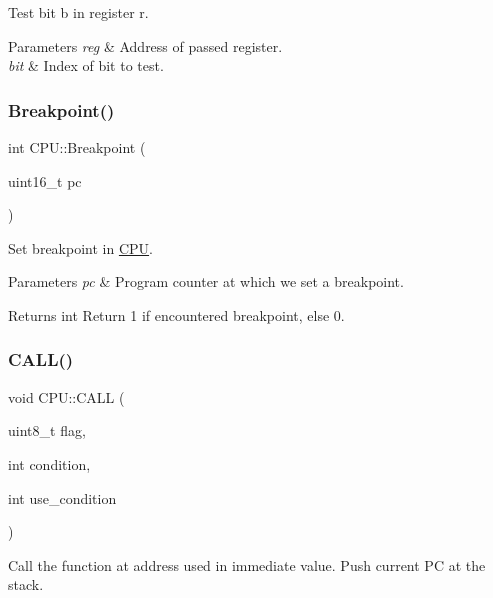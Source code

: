 Test bit b in register r. 


\begin{DoxyParams}{Parameters}
{\em reg} & Address of passed register. \\
\hline
{\em bit} & Index of bit to test. \\
\hline
\end{DoxyParams}
\mbox{\label{classCPU_af4808063d0a0951498356c5fe2acd658}} 
\subsubsection{\texorpdfstring{Breakpoint()}{Breakpoint()}}
{\footnotesize\ttfamily int C\+P\+U\+::\+Breakpoint (\begin{DoxyParamCaption}\item[{uint16\+\_\+t}]{pc }\end{DoxyParamCaption})}



Set breakpoint in \mbox{\hyperlink{classCPU}{C\+PU}}. 


\begin{DoxyParams}{Parameters}
{\em pc} & Program counter at which we set a breakpoint. \\
\hline
\end{DoxyParams}
\begin{DoxyReturn}{Returns}
int Return 1 if encountered breakpoint, else 0. 
\end{DoxyReturn}
\mbox{\label{classCPU_a2e376bf06a7a624a91c1c5c696963a61}} 
\subsubsection{\texorpdfstring{C\+A\+L\+L()}{CALL()}}
{\footnotesize\ttfamily void C\+P\+U\+::\+C\+A\+LL (\begin{DoxyParamCaption}\item[{uint8\+\_\+t}]{flag,  }\item[{int}]{condition,  }\item[{int}]{use\+\_\+condition }\end{DoxyParamCaption})\hspace{0.3cm}{\ttfamily [private]}}



Call the function at address used in immediate value. Push current PC at the stack. 


